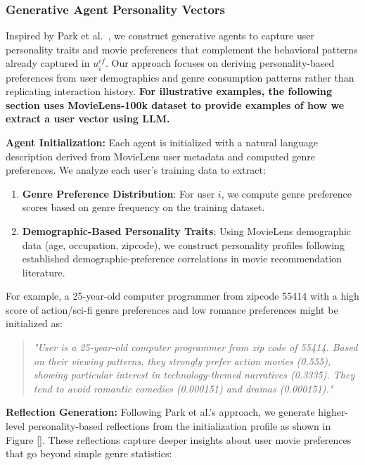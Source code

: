 \documentclass[acmsmall]{acmart}
\begin{document}
\subsubsection{Generative Agent Personality Vectors}
\label{sec:gen_vectors}

Inspired by Park et al.~\cite{park2023generative}, we construct generative agents to capture user personality traits and movie preferences that complement the behavioral patterns already captured in $u^{cf}_i$. Our approach focuses on deriving personality-based preferences from user demographics and genre consumption patterns rather than replicating interaction history. \textbf{For illustrative examples, the following section uses MovieLens-100k dataset to provide examples of how we extract a user vector using LLM.} 

\textbf{Agent Initialization:} Each agent is initialized with a natural language description derived from MovieLens user metadata and computed genre preferences. We analyze each user's training data to extract:

\begin{enumerate}
    \item \textbf{Genre Preference Distribution}: For user $i$, we compute genre preference scores based on genre frequency on the training dataset.
    
    \item \textbf{Demographic-Based Personality Traits}: Using MovieLens demographic data (age, occupation, zipcode), we construct personality profiles following established demographic-preference correlations in movie recommendation literature.
\end{enumerate}

For example, a 25-year-old computer programmer from zipcode 55414 with a high score of action/sci-fi genre preferences and low romance preferences might be initialized as:
\begin{quote}
\textit{"User is a 25-year-old computer programmer from zip code of 55414. Based on their viewing patterns, they strongly prefer action movies (0.555), showing particular interest in technology-themed narratives (0.3335). They tend to avoid romantic comedies (0.000151) and dramas (0.000151)."}
\end{quote}

\textbf{Reflection Generation:} Following Park et al.'s approach, we generate higher-level personality-based reflections from the initialization profile as shown in Figure \ref{}. These reflections capture deeper insights about user movie preferences that go beyond simple genre statistics:
\end{document}
